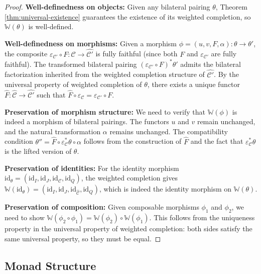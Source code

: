 \documentclass[11pt]{article}
\theoremstyle{plain}
\theoremstyle{definition}
\theoremstyle{remark}
\newcommand{\C}{\mathcal{C}}
\newcommand{\id}{\mathrm{id}}
\newcommand{\wh}[1]{\widehat{#1}}
\begin{document}
\begin{proof}
\textbf{Well-definedness on objects:} Given any bilateral pairing $\theta$, Theorem \ref{thm:universal-existence} guarantees the existence of its weighted completion, so $\mathbb{W}(\theta)$ is well-defined.

\textbf{Well-definedness on morphisms:} Given a morphism $\phi = (u, v, F, \alpha) : \theta \to \theta'$, the composite $\varepsilon_{\C'} \circ F : \C \to \wh{\C'}$ is fully faithful (since both $F$ and $\varepsilon_{\C'}$ are fully faithful). The transformed bilateral pairing $(\varepsilon_{\C'} \circ F)^* \theta'$ admits the bilateral factorization inherited from the weighted completion structure of $\wh{\C'}$. By the universal property of weighted completion of $\theta$, there exists a unique functor $\wh{F} : \wh{\C} \to \wh{\C'}$ such that $\wh{F} \circ \varepsilon_\C = \varepsilon_{\C'} \circ F$.

\textbf{Preservation of morphism structure:} We need to verify that $\mathbb{W}(\phi)$ is indeed a morphism of bilateral pairings. The functors $u$ and $v$ remain unchanged, and the natural transformation $\alpha$ remains unchanged. The compatibility condition $\theta'' = \wh{F} \circ \varepsilon_\C^* \theta \circ \alpha$ follows from the construction of $\wh{F}$ and the fact that $\varepsilon_\C^* \theta$ is the lifted version of $\theta$.

\textbf{Preservation of identities:} For the identity morphism $\id_\theta = (\id_I, \id_J, \id_\C, \id_Q)$, the weighted completion gives $\mathbb{W}(\id_\theta) = (\id_I, \id_J, \id_{\wh{\C}}, \id_Q)$, which is indeed the identity morphism on $\mathbb{W}(\theta)$.

\textbf{Preservation of composition:} Given composable morphisms $\phi_1$ and $\phi_2$, we need to show $\mathbb{W}(\phi_2 \circ \phi_1) = \mathbb{W}(\phi_2) \circ \mathbb{W}(\phi_1)$. This follows from the uniqueness property in the universal property of weighted completion: both sides satisfy the same universal property, so they must be equal.
\end{proof}

\subsection{Monad Structure}
\end{document}
